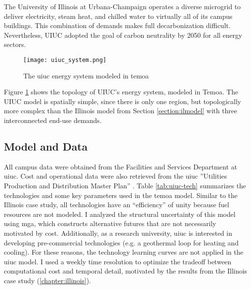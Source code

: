 
The University of Illinois at Urbana-Champaign operates a diverse microgrid to
deliver electricity, steam heat, and chilled water to virtually all of its
campus buildings. This combination of demands makes full decarbonization difficult.
Nevertheless, UIUC adopted the goal of carbon neutrality by 2050 for all energy sectors.

\begin{figure}[H]
  \texttt{[image: uiuc\_system.png]}
  \caption{The \gls{uiuc} energy system modeled in \gls{temoa}}
  \label{fig:uiucsys}
\end{figure}

Figure \ref{fig:uiucsys} shows the topology of UIUC’s energy system, modeled in Temoa.
The UIUC model is spatially simple, since there is only one region, but topologically
more complex than the Illinois model from Section \ref{section:ilmodel} with
three interconnected end-use demands.

\subsection{Model and Data}
All campus data were obtained from the Facilities and Services Department at \gls{uiuc}.
Cost and operational data were also retrieved from the \gls{uiuc} ''Utilities
Production and Distribution Master Plan'' \cite{affiliated_engineers_inc_utilities_2015}.
Table \ref{tab:uiuc-tech} summarizes the technologies and some key parameters
used in the \gls{temoa} model. Similar to the Illinois case study, all technologies have
an ``efficiency'' of unity because fuel resources are not modeled.
I analyzed the structural uncertainty of this model using \gls{mga}, which constructs
alternative futures that are not necessarily motivated by cost. Additionally,
as a research university, \gls{uiuc} is interested in developing pre-commercial
technologies (e.g. a geothermal loop for heating and cooling). For these reasons,
the technology learning curves are not applied in the \gls{uiuc} model. I used a
weekly time resolution to optimize the tradeoff between computational cost and
temporal detail, motivated by the results from the Illinois case study
(\ref{chapter:illinois}).

